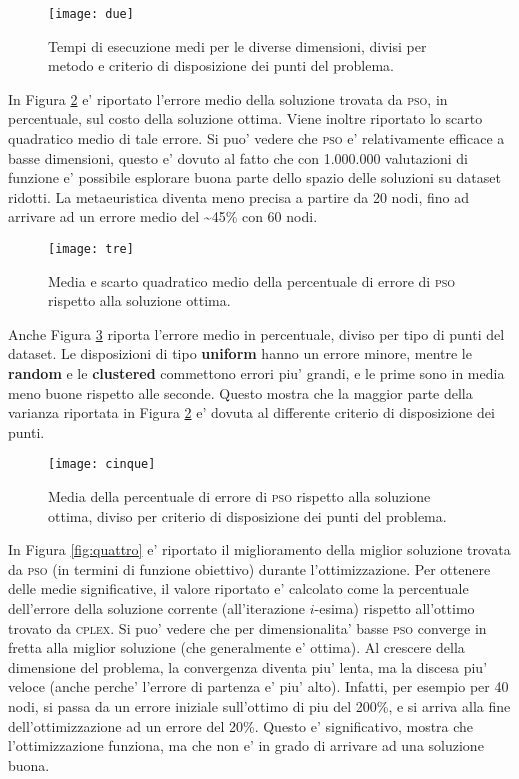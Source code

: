\documentclass[
12pt, %
a4paper, %
oneside, %
headinclude,footinclude, %
BCOR5mm, %
]{scrartcl}
\begin{document}
\begin{figure}[htpb]
	\centering
	\texttt{[image: due]}
	\caption[]{Tempi di esecuzione medi per le diverse dimensioni, divisi per metodo e criterio di disposizione dei punti del problema. }
	\label{fig:due}
\end{figure}

In Figura \ref{fig:tre} e' riportato l'errore medio della soluzione trovata da \textsc{pso}, in percentuale, sul costo della soluzione ottima. Viene inoltre riportato lo scarto quadratico medio di tale errore. Si puo' vedere che \textsc{pso} e' relativamente efficace a basse dimensioni, questo e' dovuto al fatto che con 1.000.000 valutazioni di funzione e' possibile esplorare buona parte dello spazio delle soluzioni su dataset ridotti. La metaeuristica diventa meno precisa a partire da 20 nodi, fino ad arrivare ad un errore medio del \textasciitilde 45\% con 60 nodi.

\begin{figure}[htpb]
	\centering
	\texttt{[image: tre]}
	\caption[]{Media e scarto quadratico medio della percentuale di errore di \textsc{pso} rispetto alla soluzione ottima.}
	\label{fig:tre}
\end{figure}

Anche Figura \ref{fig:cinque} riporta l'errore medio in percentuale, diviso per tipo di punti del dataset. Le disposizioni di tipo \textbf{uniform} hanno un errore minore, mentre le \textbf{random} e le \textbf{clustered} commettono errori piu' grandi, e le prime sono in media meno buone rispetto alle seconde. Questo mostra che la maggior parte della varianza riportata in Figura \ref{fig:tre} e' dovuta al differente criterio di disposizione dei punti.

\begin{figure}[htpb]
	\centering
	\texttt{[image: cinque]}
	\caption[]{Media della percentuale di errore di \textsc{pso} rispetto alla soluzione ottima, diviso per criterio di disposizione dei punti del problema.}
	\label{fig:cinque}
\end{figure}


In Figura \ref{fig:quattro} e' riportato il miglioramento della miglior soluzione trovata da \textsc{pso} (in termini di funzione obiettivo) durante l'ottimizzazione. Per ottenere delle medie significative, il valore riportato e' calcolato come la percentuale dell'errore della soluzione corrente (all'iterazione $i$-esima) rispetto all'ottimo trovato da \textsc{cplex}. Si puo' vedere che per dimensionalita' basse \textsc{pso} converge in fretta alla miglior soluzione (che generalmente e' ottima). Al crescere della dimensione del problema, la convergenza diventa piu' lenta, ma la discesa piu' veloce (anche perche' l'errore di partenza e' piu' alto). Infatti, per esempio per 40 nodi, si passa da un errore iniziale sull'ottimo di piu del 200\%, e si arriva alla fine dell'ottimizzazione ad un errore del 20\%. Questo e' significativo, mostra che l'ottimizzazione funziona, ma che non e' in grado di arrivare ad una soluzione buona.
\end{document}
